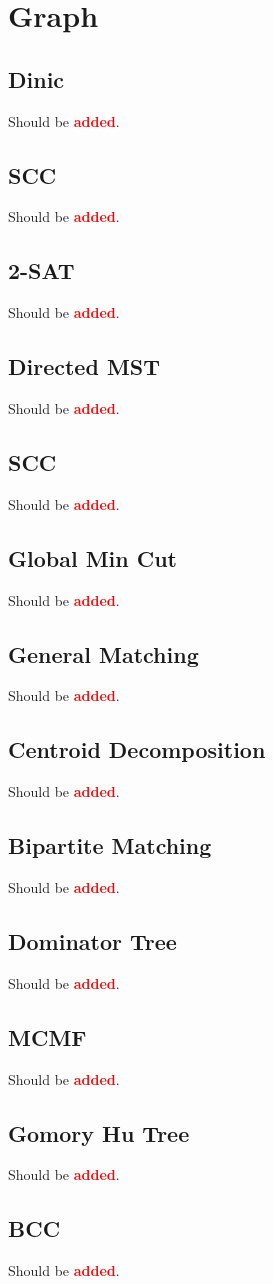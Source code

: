 \documentclass[landscape, 8pt, a4paper, oneside, twocolumn]{extarticle}
\newcommand{\added}{Should be \textcolor{red}{\textbf{added}}.}
\begin{document}
\section{Graph}
\subsection{Dinic}
\added
\subsection{SCC}
\added
\subsection{2-SAT}
\added
\subsection{Directed MST}
\added
\subsection{SCC}
\added
\subsection{Global Min Cut}
\added
\subsection{General Matching}
\added
\subsection{Centroid Decomposition}
\added
\subsection{Bipartite Matching}
\added
\subsection{Dominator Tree}
\added
\subsection{MCMF}
\added
\subsection{Gomory Hu Tree}
\added
\subsection{BCC}
\added
\end{document}
